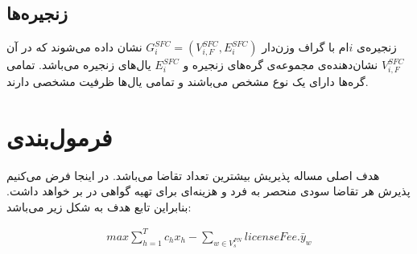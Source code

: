 \subsection{زنجیره‌ها}
زنجیره‌‌ی \(i\)ام با گراف وزن‌دار
\(G^{SFC}_i = (V^{SFC}_{i, F}, E^{SFC}_i)\)
نشان داده می‌شوند
که در آن
\(V^{SFC}_{i, F}\)
نشان‌دهنده‌ی مجموعه‌ی گره‌های زنجیره
و
\(E^{SFC}_{i}\)
یال‌های زنجیره می‌باشد.
تمامی گره‌ها دارای یک نوع مشخص می‌باشند و تمامی یال‌ها ظرفیت مشخصی دارند.

\section{فرمول‌بندی}

هدف اصلی مساله پذیریش بیشترین تعداد تقاضا می‌باشد.
در اینجا فرض می‌کنیم پذیرش هر تقاضا سودی منحصر به فرد و هزینه‌ای برای تهیه گواهی  در بر خواهد داشت.
بنابراین تابع هدف به شکل زیر می‌باشد:

\begin{latin}\begin{align}
    max \sum_{h=1}^{T} c_hx_h - \sum_{w \in V_s^{PN}} licenseFee . \bar{y}_w
\end{align}\end{latin}

